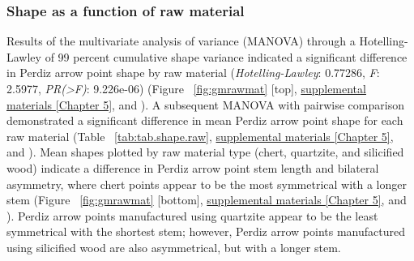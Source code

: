 \documentclass[review]{elsarticle}
\begin{document}
\subsubsection*{Shape as a function of raw material}

Results of the multivariate analysis of variance (MANOVA) through a Hotelling-Lawley of 99 percent cumulative shape variance indicated a significant difference in Perdiz arrow point shape by raw material (\textit{Hotelling-Lawley}: 0.77286, \textit{F}: 2.5977, \textit{PR(>F)}: 9.226e-06) (Figure ~\ref{fig:gmrawmat} [top], \href{https://aksel-blaise.github.io/perdiz/elliptical-fourier-analysis.html}{supplemental materials [Chapter 5]}, and \citealt{RN8980}). A subsequent MANOVA with pairwise comparison demonstrated a significant difference in mean Perdiz arrow point shape for each raw material (Table ~\ref{tab:tab.shape.raw}, \href{https://aksel-blaise.github.io/perdiz/elliptical-fourier-analysis.html}{supplemental materials [Chapter 5]}, and \citealp{RN8980}). Mean shapes plotted by raw material type (chert, quartzite, and silicified wood) indicate a difference in Perdiz arrow point stem length and bilateral asymmetry, where chert points appear to be the most symmetrical with a longer stem (Figure ~\ref{fig:gmrawmat} [bottom], \href{https://aksel-blaise.github.io/perdiz/elliptical-fourier-analysis.html}{supplemental materials [Chapter 5]}, and \citealp{RN8980}). Perdiz arrow points manufactured using quartzite appear to be the least symmetrical with the shortest stem; however, Perdiz arrow points manufactured using silicified wood are also asymmetrical, but with a longer stem.
\end{document}
